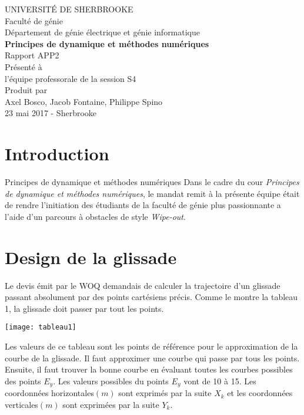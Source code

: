 \documentclass[12pt]{article}
\begin{document}
\begin{titlepage} 
	\large
	{
		\begin{center}
			UNIVERSITÉ DE SHERBROOKE\\Faculté de génie\\
			Département de génie électrique et génie informatique\\
			\vspace{3cm}
			{\LARGE\textbf{Principes de dynamique et méthodes numériques}}\\
			\vspace{2cm}
			\LARGE{Rapport APP2}\\
			\vspace{2cm}
			Présenté à\\l'équipe professorale de la session S4\\
			\vspace{2cm}
			Produit par\\Axel Bosco, Jacob Fontaine, Philippe Spino\\
			\vspace{1cm}
			\vfill{23 mai 2017 - Sherbrooke}
		\end{center}
	}
\end{titlepage}
\tableofcontents
\newpage
\section{Introduction}
Principes de dynamique et méthodes numériques
Dans le cadre du cour \textit{Principes de dynamique et méthodes numériques}, le mandat remit à la présente équipe était de rendre l'initiation des étudiants de la faculté de génie plus passionnante a l'aide d'un parcours à obstacles de style \textit{Wipe-out}.

\section{Design de la glissade}
Le devis émit par le WOQ demandais de calculer la trajectoire d'un glissade passant absolument par des points cartésiens précis. Comme le montre la tableau 1, la glissade doit passer par tout les points.

\begin{center}
	\texttt{[image: tableau1]}
\end{center}
Les valeurs de ce tableau sont les points de référence pour le approximation de la courbe de la glissade. Il faut approximer une courbe qui passe par tous les points. Ensuite, il faut trouver la bonne courbe en évaluant toutes les courbes possibles des points $E_y$. Les valeurs possibles du points $E_y$ vont de 10 à 15. Les coordonnées horizontales$(m)$ sont exprimés par la suite $X_k$ et les coordonnées verticales$(m)$ sont exprimées par la suite $Y_k$. 
\end{document}

